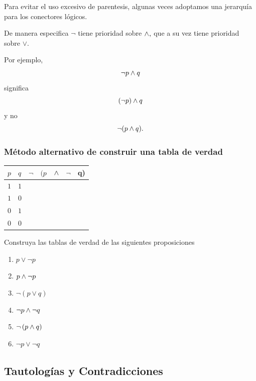 \documentclass[xcolor={svgnames},
  hyperref={colorlinks}, 
  spanish, 12pt]{beamer}
\numberwithin{equation}{section} %
\numberwithin{figure}{section} %
\begin{document}
\begin{frame}
 \begin{rem}
  Para evitar el uso excesivo de parentesis, algunas veces adoptamos una jerarqu\'ia para los conectores l\'ogicos. 
  \pause
  
  De manera especifica $\neg$ tiene prioridad sobre $\wedge,$ que a su vez tiene prioridad sobre $\vee$.
 \end{rem}
\end{frame}

\begin{frame}
 Por ejemplo, $$\neg p \wedge q$$ significa $$\left( \neg p \right) \wedge q$$ \pause y no
 $$
 \neg(p \wedge q).
 $$
\end{frame}

\begin{frame}
 \frametitle{M\'etodo alternativo de construir una tabla de verdad}
\begin{center}
\begin{tabular}{|l|l|l|l|l|l|l|}\hline
 $p$ & $q$ & $\neg$ & $(p$ & $\wedge$ & $\neg$ & q) \\\hline
 $1$ & $1$ &  &  & &  & \\\hline
 $1$ & $0$ &  &  & &  & \\\hline
 $0$ & $1$ &  &  & &  & \\\hline
 $0$ & $0$ &  &  & &  & \\\hline
\end{tabular}
\end{center}

\end{frame}

\begin{frame}
\begin{evc} Construya las tablas de verdad de las siguientes proposiciones
\begin{enumerate}
 \item $p\vee \neg p$
 \item $p\wedge \neg p$
 \item $\neg\left( p \vee q \right)$
 \item $\neg p \wedge \neg q$
 \item $\neg\left( p \wedge q \right)$
 \item $\neg p \vee \neg q$
\end{enumerate}


\end{evc}

\end{frame}


\subsection{Tautolog\'ias y Contradicciones}
\end{document}
